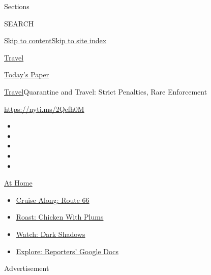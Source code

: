 Sections

SEARCH

\protect\hyperlink{site-content}{Skip to
content}\protect\hyperlink{site-index}{Skip to site index}

\href{https://www.nytimes3xbfgragh.onion/section/travel}{Travel}

\href{https://myaccount.nytimes3xbfgragh.onion/auth/login?response_type=cookie\&client_id=vi}{}

\href{https://www.nytimes3xbfgragh.onion/section/todayspaper}{Today's
Paper}

\href{/section/travel}{Travel}\textbar{}Quarantine and Travel: Strict
Penalties, Rare Enforcement

\url{https://nyti.ms/2Qefh0M}

\begin{itemize}
\item
\item
\item
\item
\item
\end{itemize}

\href{https://www.nytimes3xbfgragh.onion/spotlight/at-home?action=click\&pgtype=Article\&state=default\&region=TOP_BANNER\&context=at_home_menu}{At
Home}

\begin{itemize}
\tightlist
\item
  \href{https://www.nytimes3xbfgragh.onion/2020/09/07/travel/route-66.html?action=click\&pgtype=Article\&state=default\&region=TOP_BANNER\&context=at_home_menu}{Cruise
  Along: Route 66}
\item
  \href{https://www.nytimes3xbfgragh.onion/2020/09/04/dining/sheet-pan-chicken.html?action=click\&pgtype=Article\&state=default\&region=TOP_BANNER\&context=at_home_menu}{Roast:
  Chicken With Plums}
\item
  \href{https://www.nytimes3xbfgragh.onion/2020/09/04/arts/television/dark-shadows-stream.html?action=click\&pgtype=Article\&state=default\&region=TOP_BANNER\&context=at_home_menu}{Watch:
  Dark Shadows}
\item
  \href{https://www.nytimes3xbfgragh.onion/interactive/2020/at-home/even-more-reporters-editors-diaries-lists-recommendations.html?action=click\&pgtype=Article\&state=default\&region=TOP_BANNER\&context=at_home_menu}{Explore:
  Reporters' Google Docs}
\end{itemize}

Advertisement

